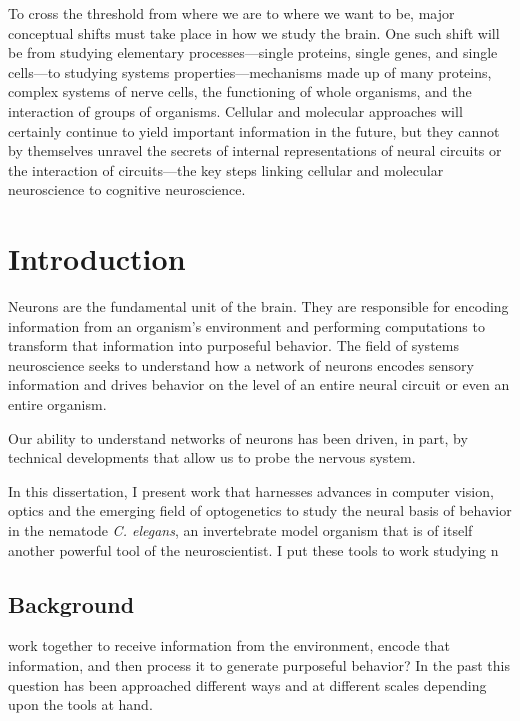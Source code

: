 \begin{savequote}[75mm] 
To cross the threshold from where we are to where we want to be, major conceptual shifts must take place in how we study the brain. One such shift will be from studying elementary processes---single proteins, single genes, and single cells---to studying systems properties---mechanisms made up of many proteins, complex systems of nerve cells, the functioning of whole organisms, and the interaction of groups of organisms. Cellular and molecular approaches will certainly continue to yield important information in the future, but they cannot by themselves unravel the secrets of internal representations of neural circuits or the interaction of circuits---the key steps linking cellular and molecular neuroscience to cognitive neuroscience. 
\end{savequote}
\chapter{Introduction}
Neurons are the fundamental unit of the brain.  They are responsible for encoding information from an organism's environment and performing computations to transform that information into purposeful behavior.  The field of systems neuroscience seeks to understand how a network of neurons encodes sensory information and drives behavior on the level of an entire neural circuit or even an entire organism.

Our ability to understand networks of neurons has been driven, in part, by technical developments that allow us to probe the nervous system. 

In this dissertation, I present work that harnesses advances in computer vision, optics and the emerging field of optogenetics to study the neural basis of behavior in the nematode \emph{C. elegans}, an invertebrate model organism that is of itself another powerful tool of the neuroscientist. I put these tools to work studying n	 

\section{Background}
 work together to receive information from the environment, encode that information, and then process it to generate  purposeful behavior? In the past this question has been approached different ways and at different scales depending upon the tools at hand. 


